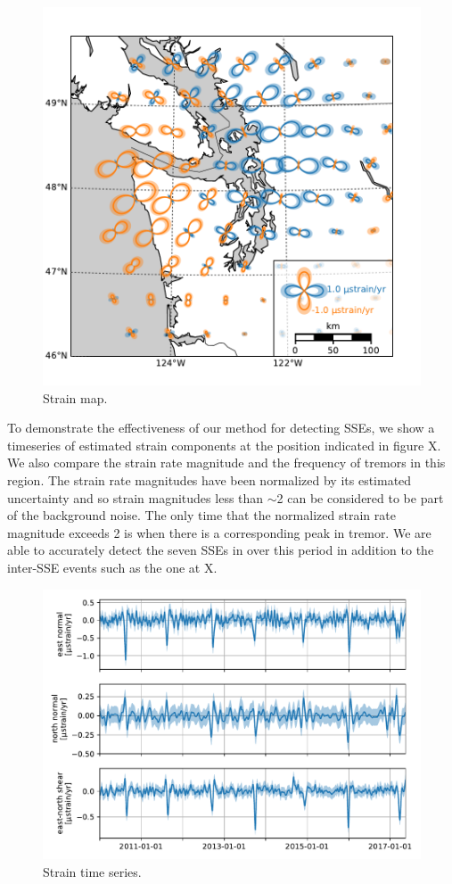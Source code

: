 \documentclass[10pt,a4paper]{article}
\begin{document}
\begin{figure}
\includegraphics{figures/strain_map/strain-map.pdf}
\caption{Strain map.}   
\label{fig:StrainMap}
\end{figure}

To demonstrate the effectiveness of our method for detecting SSEs, we show a timeseries of estimated strain components at the position indicated in figure X.  We also compare the strain rate magnitude and the frequency of tremors in this region.  The strain rate magnitudes have been normalized by its estimated uncertainty and so strain magnitudes less than ${\sim}$2 can be considered to be part of the background noise. The only time that the normalized strain rate magnitude exceeds 2 is when there is a corresponding peak in tremor.  We are able to accurately detect the seven SSEs in over this period in addition to the inter-SSE events such as the one at X.      

\begin{figure}
\includegraphics{figures/strain_ts/strain-ts.pdf}
\caption{Strain time series.}   
\label{fig:StrainTs}
\end{figure}
\end{document}
